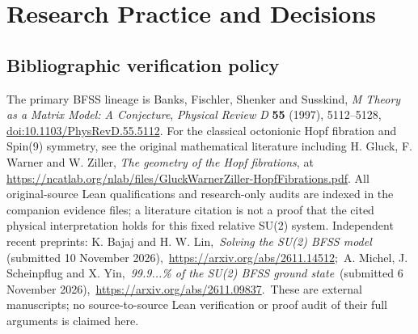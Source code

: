 \documentclass[11pt,oneside]{book}
\theoremstyle{definition}
\theoremstyle{remark}
\begin{document}
\part{Research Practice and Decisions}



\appendix








\backmatter
\chapter*{Bibliographic verification policy}
The primary BFSS lineage is Banks, Fischler, Shenker and Susskind,
\emph{M Theory as a Matrix Model: A Conjecture},
\emph{Physical Review D} \textbf{55} (1997), 5112--5128,
\href{https://doi.org/10.1103/PhysRevD.55.5112}{doi:10.1103/PhysRevD.55.5112}.
For the classical octonionic Hopf fibration and Spin(9) symmetry,
see the original mathematical literature including
H. Gluck, F. Warner and W. Ziller,
\emph{The geometry of the Hopf fibrations}, at
\url{https://ncatlab.org/nlab/files/GluckWarnerZiller-HopfFibrations.pdf}.
All original-source Lean qualifications and research-only audits are
indexed in the companion evidence files; a literature citation is not
a proof that the cited physical interpretation holds for this fixed
relative SU(2) system.
Independent recent preprints: K. Bajaj and H. W. Lin,\
\emph{Solving the SU(2) BFSS model} (submitted 10 November 2026),\
\url{https://arxiv.org/abs/2611.14512};\
A. Michel, J. Scheinpflug and X. Yin,\
\emph{99.9...\% of the SU(2) BFSS ground state}\
(submitted 6 November 2026),\
\url{https://arxiv.org/abs/2611.09837}.\
These are external manuscripts; no source-to-source Lean verification or proof audit of their full arguments is claimed here.
\end{document}
